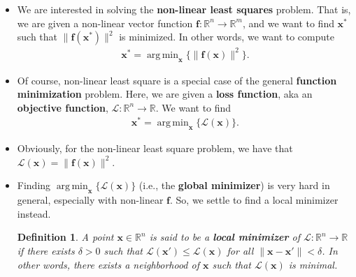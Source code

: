 \documentclass[10pt]{article}
\newtheorem{definition}[lemma]{Definition}
\newcommand{\ve}[1]{\mathbf{#1}}
\newcommand{\ra}{\rightarrow}
\newcommand{\mcal}[1]{\mathcal{#1}}
\newcommand{\Real}{\mathbb{R}}
\DeclareMathOperator*{\argmin}{arg\,min}
\begin{document}
\begin{itemize}
    \item We are interested in solving the {\bf non-linear least squares} problem. That is, we are given a non-linear vector function $\ve{f}: \Real^n \ra \Real^m$, and we want to find $\ve{x}^*$ such that $\| \ve{f}(\ve{x}^*) \|^2$ is minimized. In other words, we want to compute
    \begin{align*}
        \ve{x}^* = \argmin_{\ve{x}} \big\{ \| \ve{f}(\ve{x}) \|^2 \big\}.
    \end{align*}

    \item Of course, non-linear least square is a special case of the general {\bf function minimization} problem. Here, we are given a {\bf loss function}, aka an {\bf objective function}, $\mcal{L}: \Real^n \ra \Real$. We want to find
    \begin{align*}
        \ve{x}^* = \argmin_{\ve{x}} \big\{ \mcal{L}(\ve{x}) \big\}.
    \end{align*}

    \item Obviously, for the non-linear least square problem, we have that $\mcal{L}(\ve{x}) = \| \ve{f}(\ve{x}) \|^2$.
    
    \item Finding $\argmin_{\ve{x}} \{ \mcal{L}(\ve{x}) \}$ (i.e., the {\bf global minimizer}) is very hard in general, especially with non-linear $\ve{f}$. So, we settle to find a local minimizer instead.
    
    \begin{definition}
        A point $\ve{x} \in \Real^n$ is said to be a {\bf local minimizer} of $\mcal{L}: \Real^n \ra \Real$ if there exists $\delta > 0$ such that $\mcal{L}(\ve{x}') \leq \mcal{L}(\ve{x})$ for all $\| \ve{x} - \ve{x}' \| < \delta$. In other words, there exists a neighborhood of $\ve{x}$ such that $\mcal{L}(\ve{x})$ is minimal.
    \end{definition}


\end{itemize}
\end{document}
